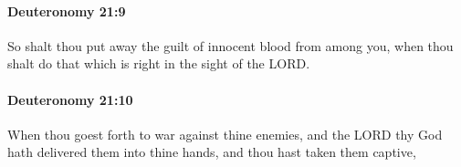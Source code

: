 		\paragraph{Deuteronomy 21:9} %
			\label{DEUTERONOMY-21-9}

			So shalt thou put away the guilt of innocent blood from among you, when thou shalt do that which is right in the sight of the LORD.


		\paragraph{Deuteronomy 21:10} %
			\label{DEUTERONOMY-21-10}

			When thou goest forth to war against thine enemies, and the LORD thy God hath delivered them into thine hands, and thou hast taken them captive,


